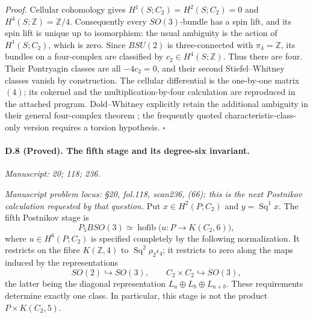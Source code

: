 \emph{Proof.} Cellular cohomology gives $H^1(S;C_2)=H^2(S;C_2)=0$ and $H^4(S;\mathbb Z)=\mathbb Z/4$. Consequently every $SO(3)$-bundle has a spin lift, and its spin lift is unique up to isomorphism: the usual ambiguity is the action of $H^1(S;C_2)$, which is zero. Since $BSU(2)$ is three-connected with $\pi_4=\mathbb Z$, its bundles on a four-complex are classified by $c_2\in H^4(S;\mathbb Z)$. Thus there are four. Their Pontryagin classes are all $-4c_2=0$, and their second Stiefel--Whitney classes vanish by construction. The cellular differential is the one-by-one matrix $(4)$; its cokernel and the multiplication-by-four calculation are reproduced in the attached program. Dold--Whitney explicitly retain the additional ambiguity in their general four-complex theorem \citep{DoldWhitney1959}; the frequently quoted characteristic-class-only version requires a torsion hypothesis. \hfill$\square$

\paragraph{D.8 (Proved). The fifth stage and its degree-six invariant.}
\textit{Manuscript: 20; 118; 236.}

\emph{Manuscript problem locus: \S20, fol.118, scan236, (66); this is the next Postnikov calculation requested by that question.}
Put $x\in H^2(P;C_2)$ and $y=\operatorname{Sq}^1x$. The fifth Postnikov stage is
\[
P_5BSO(3)\simeq\operatorname{hofib}
 \bigl(u:P\longrightarrow K(C_2,6)\bigr),
\]
where $u\in H^6(P;C_2)$ is specified completely by the following normalization. It restricts on the fibre $K(\mathbb Z,4)$ to $\operatorname{Sq}^2\rho_2\iota_4$; it restricts to zero along the maps induced by the representations
\[
SO(2)\hookrightarrow SO(3),\qquad
C_2\times C_2\hookrightarrow SO(3),
\]
the latter being the diagonal representation $L_a\oplus L_b\oplus L_{a+b}$. These requirements determine exactly one class. In particular, this stage is not the product $P\times K(C_2,5)$.

